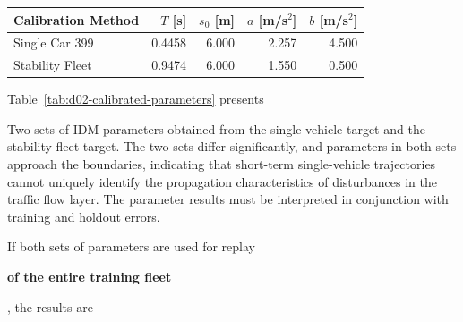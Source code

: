 \documentclass[11pt,a4paper,openany]{book}
\numberwithin{equation}{chapter}
\numberwithin{figure}{chapter}
\numberwithin{table}{chapter}
\newcommand{\tabletext}[2]{%
  \par\smallskip\noindent
  Table~\ref{#1} presents #2
\par\smallskip
}
\begin{document}
\begin{center}
\small
{}
\label{tab:d02-calibrated-parameters}
\begin{tabular}{p{3.7cm}rrrr}
\toprule
\textbf{Calibration Method} & $T$ [s] & $s_0$ [m] & $a$ [m/s$^2$] & $b$ [m/s$^2$]\\
\midrule







Single Car 399




& 0.4458 & 6.000 & 2.257 & 4.500\\







Stability Fleet




& 0.9474 & 6.000 & 1.550 & 0.500\\
\bottomrule
\end{tabular}
\end{center}
\tabletext{tab:d02-calibrated-parameters}{




Two sets of IDM parameters obtained from the single-vehicle target and the stability fleet target. The two sets differ significantly, and parameters in both sets approach the boundaries, indicating that short-term single-vehicle trajectories cannot uniquely identify the propagation characteristics of disturbances in the traffic flow layer. The parameter results must be interpreted in conjunction with training and holdout errors.
}







If both sets of parameters are used for replay




\textbf{of the entire training fleet}




, the results are
\end{document}
